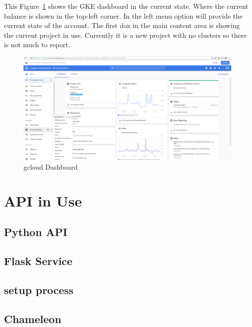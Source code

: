 This Figure~\ref{fig:gcloud-dashboard} shows the GKE dashboard in the current 
state. Where the current 
balance is shown in the top-left corner. In the left menu option will provide 
the current state of the account. The first dox in the main content area is 
showing the current project in use. Currently it is a new project with no
 clusters so there is not much to report.
 
 \begin{figure}[htb]
   \centering\includegraphics[width=\columnwidth]{images/hid_417_gcloud_browser.png}
   \caption{gcloud Dashboard}\label{fig:gcloud-dashboard}
 \end{figure}

 \section{API in Use}


\subsection{Python API}

\subsection{Flask Service}

\subsection{setup process}

\subsection{Chameleon}

